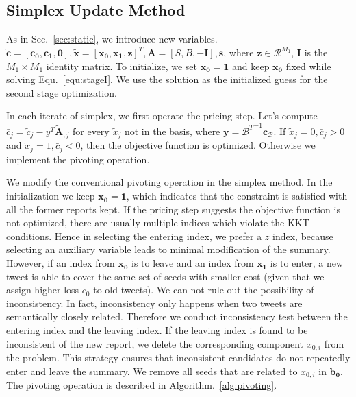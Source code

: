 \documentclass[envcountsame]{llncs}
\begin{document}
\subsection{Simplex Update Method}

As in Sec.~\ref{sec:static}, we introduce new variables.  $\tilde{\mathbf{c}}=[\mathbf{c_0},\mathbf{c_1}, \mathbf{0}],\tilde{\mathbf{x}}=[\mathbf{x_0},\mathbf{x_1},\mathbf{z}]^T,\tilde{\mathbf{A}}=[S,B,-\mathbf{I}],\mathbf{s}$, where $\mathbf{z}\in\mathcal{R}^{M_1}$, $ \mathbf{I}$ is the $M_1\times M_1$ identity matrix. To initialize, we set  $\mathbf{x_0}=\mathbf{1}$ and keep $\mathbf{x_0}$ fixed while solving Equ.~\ref{equ:stageI}. We use the solution as the initialized guess for the second stage optimization.

In each iterate of simplex, we first operate the pricing step.  Let's compute $\bar{c}_j = \tilde{c}_j - y^T\tilde{\mathbf{A}}_{,j}$ for every $\tilde{x}_j$ not in the basis, where $\mathbf{y} = {\mathcal{B}^T}^{-1}\mathbf{c_\mathcal{B}}$. If $\tilde{x}_j = 0, \bar{c}_j > 0$ and $\tilde{x}_j = 1,\bar{c}_j < 0$, then the objective function is optimized. Otherwise we implement the pivoting operation.

We modify the conventional pivoting operation in the simplex method. In the initialization we keep $\mathbf{x_0}=\mathbf{1}$, which indicates that the constraint is satisfied with all the former reports kept. If the pricing step suggests the objective function is not optimized, there are usually multiple indices which violate the KKT conditions.  Hence in selecting the entering index, we prefer a $z$ index, because selecting an auxiliary variable leads to minimal modification of the summary. However, if an index from $\mathbf{x_0}$ is to leave and an index from $\mathbf{x_1}$ is to enter, a new tweet is able to cover the same set of seeds with smaller cost (given that we assign higher loss $c_0$ to old tweets). We can not rule out the possibility of inconsistency. In fact, inconsistency only happens when two tweets are semantically closely related. Therefore we conduct inconsistency test between the entering index and the leaving index. If the leaving index is found to be inconsistent of the new report, we delete the corresponding component $x_{0,i}$ from the problem. This strategy ensures that inconsistent candidates do not repeatedly enter and leave the summary. We remove all seeds that are related to $x_{0,i}$ in $\mathbf{b_0}$. The pivoting operation is described in Algorithm.~\ref{alg:pivoting}.
\end{document}
